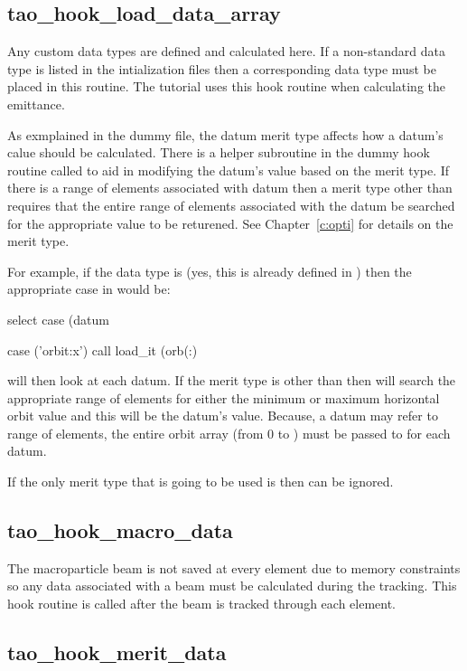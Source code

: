\subsection{tao\_hook\_load\_data\_array}

Any custom data types are defined and calculated here. If a non-standard data
type is listed in the intialization files then a corresponding data type must
be placed in this routine. The tutorial uses this hook routine when
calculating the emittance. 

As exmplained in the dummy file, the datum merit type
affects how a datum's calue should be calculated. There is a helper subroutine
in the dummy hook routine called  to aid in modifying the datum's value based on the
merit type. If there is a range of elements associated with datum then a merit
type other than  requires that the entire range of elements
associated with the datum be searched for the appropriate value to be returened.
See Chapter~\ref{c:opti} for details on the merit type. 

For example, if the data type is  (yes, this is already defined in
\tao) then the appropriate case in  would be:
\begin{example}
select case (datum%

case ('orbit:x')
  call load_it (orb(:)%
\end{example}
 will then look at each datum. If the merit type is other than
 then  will search the appropriate range of elements for
either the minimum or maximum horizontal orbit value and this will be the
datum's value. Because, a datum may refer to range of elements, the entire orbit
array (from 0 to ) must be passed to  for each  datum.

If the only merit type that is going to be used is  then 
can be ignored.

\subsection{tao\_hook\_macro\_data}

The macroparticle beam is not saved at every element due to memory constraints
so any data associated with a beam must be calculated during the tracking. This
hook routine is called after the beam is tracked through each element.

\subsection{tao\_hook\_merit\_data}

